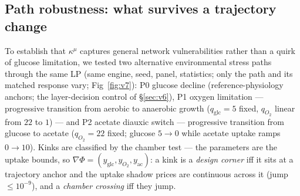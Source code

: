 \documentclass[11pt,a4paper]{article}
\theoremstyle{plain}
\theoremstyle{definition}
\theoremstyle{remark}
\newcommand{\kmu}{\kappa^{\mu}}
\begin{document}
\subsection{Path robustness: what survives a trajectory change}
\label{sec:v7}
To establish that $\kmu$ captures general network vulnerabilities
rather than a quirk of glucose limitation, we tested two alternative
environmental stress paths through the same LP (same engine, seed,
panel, statistics; only the path and its matched response vary;
Fig~\ref{fig:v7}): P0 glucose decline (reference-physiology anchors;
the layer-decision control of \S\ref{sec:v6}), P1 oxygen limitation
--- progressive transition from aerobic to anaerobic growth
($q_{\mathrm{glc}} = 5$ fixed, $q_{O_2}$ linear from $22$ to $1$) ---
and P2 acetate diauxic switch --- progressive transition from glucose
to acetate ($q_{O_2} = 22$ fixed; glucose $5 \to 0$ while
acetate uptake ramps $0 \to 10$). Kinks are classified by the
chamber test --- the parameters are the uptake bounds, so
$\nabla\Phi = (y_{\mathrm{glc}}, y_{O_2}, y_{\mathrm{ac}})$: a kink is
a \emph{design corner} iff it sits at a trajectory anchor and the
uptake shadow prices are continuous across it (jump $\le 10^{-9}$),
and a \emph{chamber crossing} iff they jump.
\end{document}
